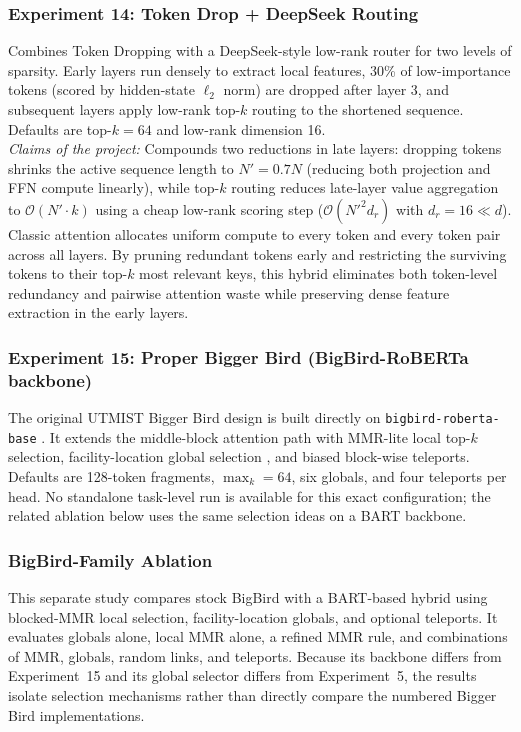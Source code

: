 \documentclass[11pt]{article}
\newcommand{\bigO}{\mathcal{O}}
\begin{document}
\subsubsection*{Experiment 14: Token Drop + DeepSeek Routing}
\label{exp:token-drop-deepseek}
 Combines Token Dropping with a DeepSeek-style
low-rank router for two levels of sparsity. Early layers run densely to
extract local features, 30\% of low-importance tokens (scored by hidden-state
$\ell_2$ norm) are dropped after layer 3, and subsequent layers apply
low-rank top-$k$ routing to the shortened sequence. Defaults are top-$k=64$
and low-rank dimension 16.\\
\emph{Claims of the project:} Compounds two reductions in late layers:
dropping tokens shrinks the active sequence length to $N' = 0.7N$ (reducing
both projection and FFN compute linearly), while top-$k$ routing reduces
late-layer value aggregation to $\bigO(N' \cdot k)$ using a cheap low-rank
scoring step ($\bigO(N'^2 d_r)$ with $d_r = 16 \ll d$).\\ Classic attention
allocates uniform compute to every token and every token pair across all
layers. By pruning redundant tokens early and restricting the surviving
tokens to their top-$k$ most relevant keys, this hybrid eliminates both
token-level redundancy and pairwise attention waste while preserving dense
feature extraction in the early layers.

\subsubsection*{Experiment 15: Proper Bigger Bird (BigBird-RoBERTa backbone)}
\label{exp:proper-bb}
The original UTMIST Bigger Bird design is built directly on
\texttt{bigbird-roberta-base} \citep{zaheer2020bigbird}. It extends the
middle-block attention path with MMR-lite local top-$k$ selection,
facility-location global selection \citep{lin2011submodular}, and biased
block-wise teleports. Defaults are 128-token fragments, $\max_k=64$, six
globals, and four teleports per head. No standalone task-level run is
available for this exact configuration; the related ablation below uses the
same selection ideas on a BART backbone.

\subsubsection*{BigBird-Family Ablation}
\label{exp:bigbird-family}
This separate study compares stock BigBird \citep{zaheer2020bigbird} with a
BART-based hybrid using blocked-MMR local selection, facility-location
globals, and optional teleports. It evaluates globals alone, local MMR alone,
a refined MMR rule, and combinations of MMR, globals, random links, and
teleports. Because its backbone differs from Experiment~15 and its global
selector differs from Experiment~5, the results isolate selection mechanisms
rather than directly compare the numbered Bigger Bird implementations.
\end{document}
